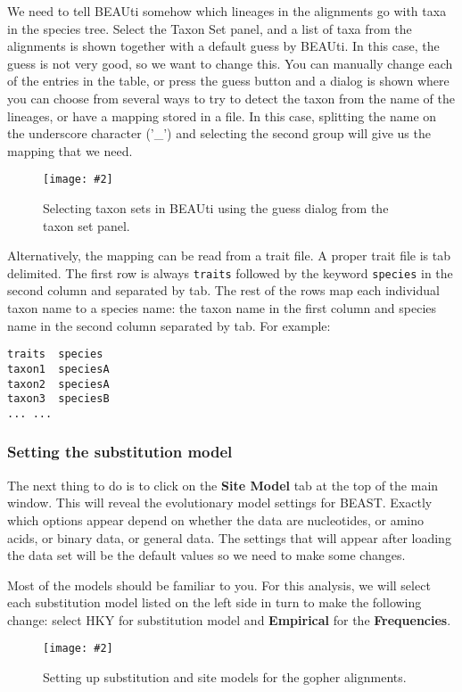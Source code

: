\documentclass{article}
\newcommand{\includeimage}[2][]{%
\texttt{[image: \#2]}
}
\begin{document}
We need to tell BEAUti somehow which lineages in the alignments go with taxa in the species tree. Select the Taxon Set panel, and a list of taxa from the alignments is shown together with a default guess by BEAUti. In this case, the guess is not very good, so we want to change this. You can manually change each of the entries in the table, or press the guess button and a dialog is shown where you can choose from several ways to try to detect the taxon from the name of the lineages, or have a mapping stored in a file. In this case, splitting the name on the underscore character ('\_') and selecting the second group will give us the mapping that we need.

\begin{figure}
\centering
\includeimage[scale=0.4]{figures/BEAUti_Guess_Taxonsets}

\caption{\label{fig.taxonset} Selecting taxon sets in BEAUti using the guess dialog from the taxon set panel.}
\end{figure}


Alternatively, the mapping can be read from a trait file.
A proper trait file is tab delimited. The first row is always \texttt{traits} followed by the keyword \texttt{species} in the second column and separated by tab. The rest of the rows map each individual taxon name to a species name: the taxon name in the first column and species name in the second column separated by tab. For example:

\begin{verbatim}
traits	species
taxon1	speciesA
taxon2	speciesA
taxon3	speciesB
... ...
\end{verbatim}



\subsubsection*{Setting the substitution model}

The next thing to do is to click on the {\bf Site Model} tab at the top of the
main window. This will reveal the evolutionary model settings for
BEAST. Exactly which options appear depend on whether the data are
nucleotides, or amino acids, or binary data, or general data.
The settings that will appear after loading the data set will
be the default values so we need to make some changes. 

Most of the models should be familiar to you. For this analysis, we
will select each substitution model listed on the 
left side in turn to make the following change: select HKY for substitution model
and \textbf{Empirical} for the \textbf{Frequencies}. 
\begin{figure}
\centering
\includeimage[scale=0.4]{figures/BEAUti_Site_Model}

\caption{\label{fig.sitemodel} Setting up substitution and site models for the gopher alignments.}
\end{figure}
\end{document}
